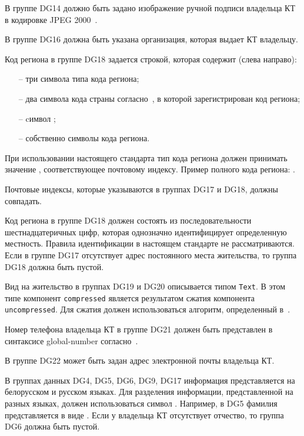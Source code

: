 
В группе DG14 должно быть задано изображение ручной подписи
владельца КТ в кодировке JPEG 2000~\cite{JPEG2000}.

В группе DG16 должна быть указана организация, которая выдает КТ владельцу. 

Код региона в группе DG18 задается строкой, которая содержит (слева направо):
\begin{itemize}
\item[--]
три символа типа кода региона;
\item[--]
два символа кода страны согласно~\cite{CountryCodes}, в которой зарегистрирован 
код региона;
\item[--]
cимвол \str{-}; 
\item[--]
собственно символы кода региона.
\end{itemize}

При использовании настоящего стандарта тип кода региона
должен принимать значение , соответствующее
почтовому индексу. Пример полного кода региона: .

Почтовые индексы, которые указываются в группах DG17 и DG18,
должны совпадать.

Код региона в группе DG18 должен состоять из последовательности 
шестнадцатеричных цифр, которая однозначно идентифицирует определенную 
местность. Правила идентификации в настоящем стандарте не рассматриваются. 
Если в группе DG17 отсутствует адрес постоянного места жительства, то 
группа DG18 должна быть пустой. 
\fi


Вид на жительство в группах DG19 и DG20 описывается типом \verb|Text|. 
В этом типе компонент \verb|compressed| является результатом сжатия компонента 
\verb|uncompressed|. Для сжатия должен использоваться алгоритм, 
определенный в~\cite{DEFLATE}. 
\fi

Номер телефона владельца КТ в группе DG21 должен быть
представлен в синтаксисе global-number согласно~\cite{RFC3966}. 

В группе DG22 может быть задан адрес электронной почты владельца КТ. 

В группах данных DG4, DG5, DG6, DG9, DG17 информация
представляется на белорусском и русском языках.
Для разделения информации, представленной на разных языках,
должен использоваться символ \str{/}. Например, в DG5 фамилия 
представляется в виде .
Если у владельца КТ отсутствует отчество, то группа DG6 должна быть пустой. 

